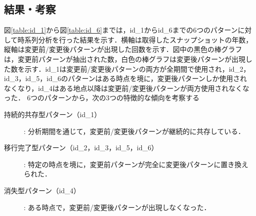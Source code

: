 \documentclass[submit,techrep,noauthor]{ipsj}
\begin{document}
\subsection{結果・考察}
図\ref{table:id_1}から図\ref{table:id_6}までは，id\_1からid\_6までの6つのパターンに対して時系列分析を行った結果を示す．横軸は取得したスナップショットの年数，縦軸は変更前/変更後パターンが出現した回数を示す．図中の黒色の棒グラフは，変更前パターンが抽出された数，白色の棒グラフは変更後パターンが出現した数を示す．id\_1は変更前/変更後パターンの両方が全期間で使用され，id\_2，id\_3，id\_5，id\_6のパターンはある時点を境に，変更後パターンしか使用されなくなり，id\_4はある地点以降は変更前/変更後パターンが両方使用されなくなった．
6つのパターンから，次の3つの特徴的な傾向を考察する
\begin{description}
    \item[持続的共存型パターン（id\_1）]: 分析期間を通じて，変更前/変更後パターンが継続的に共存している．
    \item[移行完了型パターン（id\_2，id\_3，id\_5，id\_6）]: 特定の時点を境に，変更前パターンが完全に変更後パターンに置き換えられた．
    \item[消失型パターン（id\_4）]: ある時点で，変更前/変更後パターンが出現しなくなった．
\end{description}
\end{document}
